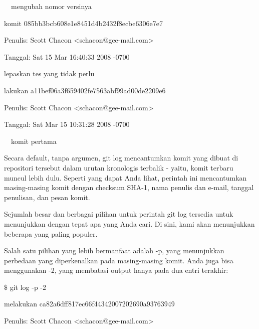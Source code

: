 \noindent 
 \hspace*{0.5in}  $  $ $  $ $  $ $  $mengubah nomor versinya \par
\noindent 
 \hspace*{0.5in} komit 085bb3bcb608e1e8451d4b2432f8ecbe6306e7e7 \par
\noindent 
 \hspace*{0.5in} Penulis: Scott Chacon <schacon@gee-mail.com> \par
\noindent 
 \hspace*{0.5in} Tanggal: Sat 15 Mar 16:40:33 2008 -0700 \par
\noindent 
lepaskan tes yang tidak perlu \par
\noindent 
 \hspace*{0.5in} lakukan a11bef06a3f659402fe7563abf99ad00de2209e6 \par
\noindent 
 \hspace*{0.5in} Penulis: Scott Chacon <schacon@gee-mail.com> \par
\noindent 
 \hspace*{0.5in} Tanggal: Sat Mar 15 10:31:28 2008 -0700 \par
\noindent 
 $  $ $  $ $  $ $  $komit pertama \par
\noindent 
Secara default, tanpa argumen, git log mencantumkan komit yang dibuat di repositori tersebut dalam urutan kronologis terbalik - yaitu, komit terbaru muncul lebih dulu. Seperti yang dapat Anda lihat, perintah ini mencantumkan masing-masing komit dengan checksum SHA-1, nama penulis dan e-mail, tanggal penulisan, dan pesan komit. \par
\noindent 
Sejumlah besar dan berbagai pilihan untuk perintah git log tersedia untuk menunjukkan dengan tepat apa yang Anda cari. Di sini, kami akan menunjukkan beberapa yang paling populer. \par
\noindent 
Salah satu pilihan yang lebih bermanfaat adalah -p, yang menunjukkan perbedaan yang diperkenalkan pada masing-masing komit. Anda juga bisa menggunakan -2, yang membatasi output hanya pada dua entri terakhir: \par
\noindent 
 \hspace*{0.5in}  $  \$  $ git log -p -2 \par
\noindent 
 \hspace*{0.5in} melakukan ca82a6dff817ec66f44342007202690a93763949 \par
\noindent 
 \hspace*{0.5in} Penulis: Scott Chacon <schacon@gee-mail.com> \par
